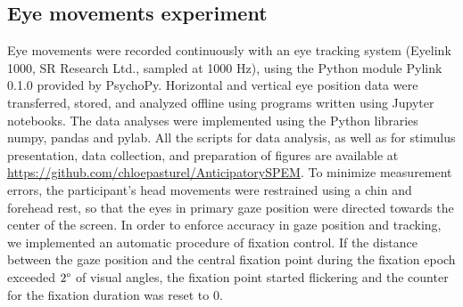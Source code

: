 \documentclass[10pt,letterpaper]{article}
\begin{document}
\subsection{Eye movements experiment}
Eye movements were recorded continuously with an eye tracking system (Eyelink 1000, SR Research Ltd., sampled at 1000 Hz), using the Python module Pylink 0.1.0 provided by PsychoPy. Horizontal and vertical eye position data were transferred, stored, and analyzed offline using programs written using Jupyter notebooks. The data analyses were implemented using the Python libraries numpy, pandas and pylab. All the scripts for data analysis, as well as for stimulus presentation, data collection, and preparation of figures are available at \url{https://github.com/chloepasturel/AnticipatorySPEM}. To minimize measurement errors, the participant's head movements were restrained using a chin and forehead rest, so that the eyes in primary gaze position were directed towards the center of the screen. In order to enforce accuracy in gaze position and tracking, we implemented an automatic procedure of fixation control. If the distance between the gaze position and the central fixation point during the fixation epoch exceeded $2\degree$ of visual angles, the fixation point started flickering and the counter for the fixation duration was reset to $0$.
\end{document}

